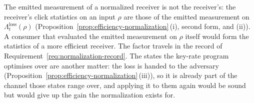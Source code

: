 
The emitted measurement of a normalized receiver is not the receiver's: the
receiver's click statistics on an input $\rho$ are those of the emitted
measurement on $\Lambda^{\mathrm{loss}}_t(\rho)$
(Proposition~\ref{prop:efficiency-normalization}\,(i), second form, and (ii)).
A consumer that evaluated the emitted measurement on $\rho$ itself would form
the statistics of a more efficient receiver. The factor travels in the record
of Requirement~\ref{req:normalization-record}. The states the key-rate program
optimises over are another matter: the loss is handed to the adversary
(Proposition~\ref{prop:efficiency-normalization}\,(iii)), so it is already
part of the channel those states range over, and applying it to them again
would be sound but would give up the gain the normalization exists for.

